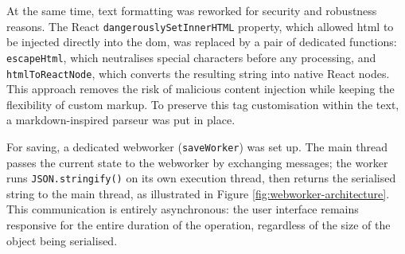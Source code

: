 At the same time, text formatting was reworked for security and robustness reasons. The React \texttt{dangerouslySetInnerHTML} property, which allowed \acrshort{html} to be injected directly into the \acrshort{dom}, was replaced by a pair of dedicated functions: \texttt{escapeHtml}, which neutralises special characters before any processing, and \texttt{htmlToReactNode}, which converts the resulting string into native React nodes. This approach removes the risk of malicious content injection while keeping the flexibility of custom markup. To preserve this tag customisation within the text, a \gls{markdown}-inspired \gls{parseur} was put in place.

For saving, a dedicated \gls{webworker} (\texttt{saveWorker}) was set up. The main thread passes the current state to the \gls{webworker} by exchanging messages; the worker runs \texttt{JSON.stringify()} on its own execution thread, then returns the serialised string to the main thread, as illustrated in Figure \ref{fig:webworker-architecture}. This communication is entirely asynchronous: the user interface remains responsive for the entire duration of the operation, regardless of the size of the object being serialised.

